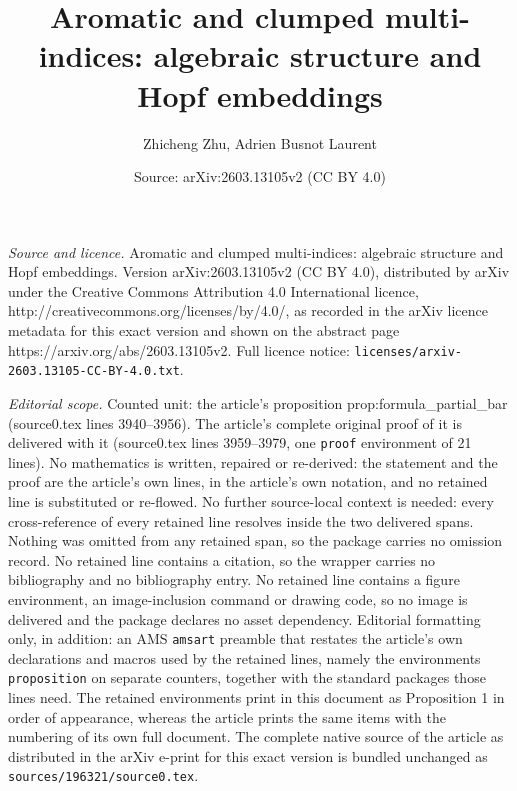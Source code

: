 \documentclass[10pt,a4paper]{amsart}
\title{Aromatic and clumped multi-indices: algebraic structure and Hopf embeddings}
\author{Zhicheng Zhu, Adrien Busnot Laurent}
\date{Source: arXiv:2603.13105v2 (CC BY 4.0)}
\begin{document}
\maketitle

\noindent\emph{Source and licence.} Aromatic and clumped multi-indices: algebraic structure and Hopf embeddings. Version arXiv:2603.13105v2 (CC BY 4.0), distributed by arXiv under the Creative Commons Attribution 4.0 International licence, http://creativecommons.org/licenses/by/4.0/, as recorded in the arXiv licence metadata for this exact version and shown on the abstract page https://arxiv.org/abs/2603.13105v2. Full licence notice: \texttt{licenses/arxiv-2603.13105-CC-BY-4.0.txt}.\par\smallskip

\noindent\textit{Editorial scope.} Counted unit: the article's proposition prop:formula\_partial\_bar (source0.tex lines 3940--3956). The article's complete original proof of it is delivered with it (source0.tex lines 3959--3979, one \texttt{proof} environment of 21 lines). No mathematics is written, repaired or re-derived: the statement and the proof are the article's own lines, in the article's own notation, and no retained line is substituted or re-flowed.  No further source-local context is needed: every cross-reference of every retained line resolves inside the two delivered spans.  Nothing was omitted from any retained span, so the package carries no omission record.  No retained line contains a citation, so the wrapper carries no bibliography and no bibliography entry.  No retained line contains a figure environment, an image-inclusion command or drawing code, so no image is delivered and the package declares no asset dependency.  Editorial formatting only, in addition: an AMS \texttt{amsart} preamble that restates the article's own declarations and macros used by the retained lines, namely the environments \texttt{proposition} on separate counters, together with the standard packages those lines need.  The retained environments print in this document as Proposition 1 in order of appearance, whereas the article prints the same items with the numbering of its own full document.  The complete native source of the article as distributed in the arXiv e-print for this exact version is bundled unchanged as \texttt{sources/196321/source0.tex}.
\end{document}
